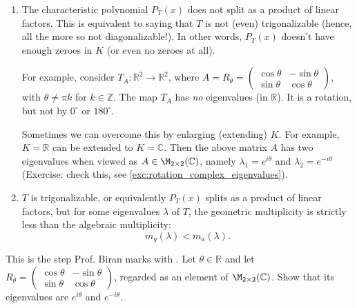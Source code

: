 \begin{enumerate}[label=\textbf{(\alph*)}]
    \item The characteristic polynomial $P_T(x)$ does not split as a product of linear factors. This is equivalent to saying that $T$ is not (even) trigonalizable (hence, all the more so not diagonalizable!). In other words, $P_T(x)$ doesn't have enough zeroes in $K$ (or even no zeroes at all).
    
    For example, consider $T_A \colon \mathbb{R}^2 \to \mathbb{R}^2$, where $A = R_\theta = \left(\begin{smallmatrix} \cos\theta & -\sin\theta \\ \sin\theta & \cos\theta \end{smallmatrix}\right)$, with $\theta \neq \pi k$ for $k \in \mathbb{Z}$. The map $T_A$ has \emph{no} eigenvalues (in $\mathbb{R}$). It is a rotation, but not by $0^\circ$ or $180^\circ$.
    
    Sometimes we can overcome this  by enlarging (extending) $K$. For example, $K = \mathbb{R}$ can be extended to $K = \mathbb{C}$. Then the above matrix $A$ has two eigenvalues when viewed as $A \in \M_{2 \times 2}(\mathbb{C})$, namely $\lambda_1 = e^{i\theta}$ and $\lambda_2 = e^{-i\theta}$ (Exercise: check this, see \cref{exc:rotation_complex_eigenvalues}).

    \item $T$ is trigonalizable, or equivalently $P_T(x)$ splits as a product of linear factors, but for some eigenvalues $\lambda$ of $T$, the geometric multiplicity is strictly less than the algebraic multiplicity:
    \[
    m_g(\lambda) < m_a(\lambda).
    \]
\end{enumerate}

\begin{exercise}
\label{exc:rotation_complex_eigenvalues}
This is the step Prof. Biran marks with . Let $\theta \in \mathbb{R}$ and let $R_\theta = \left(\begin{smallmatrix} \cos\theta & -\sin\theta \\ \sin\theta & \cos\theta \end{smallmatrix}\right)$, regarded as an element of $\M_{2 \times 2}(\mathbb{C})$. Show that its eigenvalues are $e^{i\theta}$ and $e^{-i\theta}$.
\end{exercise}

